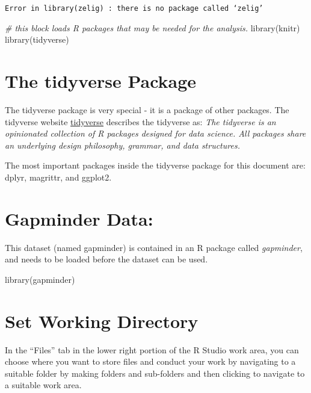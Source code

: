 \documentclass[
]{book}
\newenvironment{Shaded}{\begin{snugshade}}{\end{snugshade}}
\newcommand{\CommentTok}[1]{\textcolor[rgb]{0.56,0.35,0.01}{\textit{#1}}}
\newcommand{\FunctionTok}[1]{\textcolor[rgb]{0.00,0.00,0.00}{#1}}
\newcommand{\NormalTok}[1]{#1}
\begin{document}
\texttt{Error\ in\ library(zelig)\ :\ there\ is\ no\ package\ called\ ‘zelig’}

\begin{Shaded}
\begin{Highlighting}[]
\CommentTok{\# this block loads R packages that may be needed for the analysis.}
\FunctionTok{library}\NormalTok{(knitr)}
\FunctionTok{library}\NormalTok{(tidyverse)}
\end{Highlighting}
\end{Shaded}

\hypertarget{the-tidyverse-package}{%
\section{The tidyverse Package}\label{the-tidyverse-package}}

The tidyverse package is very special - it is a package of other packages. The tidyverse website \href{http://tidyverse.org}{tidyverse} describes the tidyverse as: \emph{The tidyverse is an opinionated collection of R packages designed for data science. All packages share an underlying design philosophy, grammar, and data structures.}

The most important packages inside the tidyverse package for this document are: dplyr, magrittr, and ggplot2.

\hypertarget{gapminder-data}{%
\section{Gapminder Data:}\label{gapminder-data}}

This dataset (named gapminder) is contained in an R package called \emph{gapminder}, and needs to be loaded before the dataset can be used.

\begin{Shaded}
\begin{Highlighting}[]
\FunctionTok{library}\NormalTok{(gapminder)}
\end{Highlighting}
\end{Shaded}

\hypertarget{set-working-directory}{%
\section{Set Working Directory}\label{set-working-directory}}

In the ``Files'' tab in the lower right portion of the R Studio work area, you can choose where you want to store files and conduct your work by navigating to a suitable folder by making folders and sub-folders and then clicking to navigate to a suitable work area.
\end{document}
